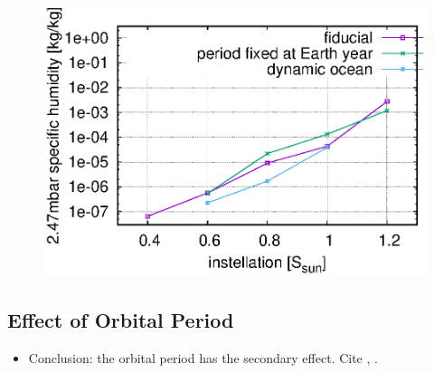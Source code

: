 \documentclass[11pt,numberedappendix,twocolappendix,]{emulateapj}
\begin{document}
\begin{figure}[!h]
    \begin{center}
    \includegraphics[width=\hsize]{fig/AqOH0TLS_GJ876_q_sensitivity_changeS0X.eps}
    \end{center}
\caption{}                                                                                                             
\label{fig:change_ocean}
\end{figure}



\subsection{Effect of Orbital Period}
\label{ss:sensitivity_Porbit}

\begin{itemize}
\item Conclusion: the orbital period has the secondary effect. Cite \citet{Yang2013}, \citet{Kopparapu2016}. 
\end{itemize}
\end{document}
